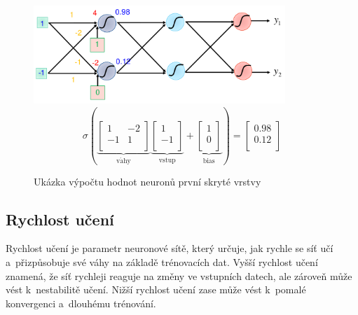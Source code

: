 \begin{figure}[ht]
    \onehalfspacing
    \centering
    \includegraphics[height=10em]{images/6_maticova-operace}
    $$
        \sigma \left(
        \underbrace{
            \left[ \begin{matrix}
                1  & -2 \\
                -1 & 1  \\
            \end{matrix} \right]
        }_{\mathrm{v\acute{a}hy}}
        \underbrace{
            \left[ \begin{matrix}
                1  \\
                -1 \\
            \end{matrix} \right]
        }_{\mathrm{vstup}} +
        \underbrace{
            \left[ \begin{matrix}
                1 \\
                0 \\
            \end{matrix} \right]
        }_{\mathrm{bias}}
        \right) = \left[ \begin{matrix}
                0.98 \\
                0.12 \\
            \end{matrix} \right]
    $$
    \caption{Ukázka výpočtu hodnot neuronů první skryté vrstvy}
\end{figure}
\FloatBarrier

\subsection{Rychlost učení}

Rychlost učení je parametr neuronové sítě, který určuje, jak rychle se síť učí a~přizpůsobuje své váhy na základě trénovacích dat. Vyšší rychlost učení znamená, že síť rychleji reaguje na změny ve vstupních datech, ale zároveň může vést k~nestabilitě učení. Nižší rychlost učení zase může vést k~pomalé konvergenci a~dlouhému trénování.

